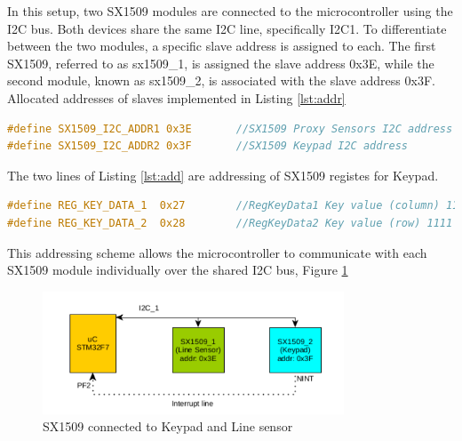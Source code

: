 \documentclass[english]{article}
\begin{document}
In this setup, two SX1509 modules are connected to the microcontroller using the I2C bus. 
Both devices share the same I2C line, specifically I2C1. To differentiate between the two modules,
a specific slave address is assigned to each. 
The first SX1509, referred to as sx1509\_1, is assigned
  the slave address 0x3E, while the second module, known as sx1509\_2, is associated with the slave address 0x3F.
\\Allocated addresses of slaves implemented in Listing \ref{lst:addr}
\begin{lstlisting}[language=C, caption={I2C Addresses}, label={lst:addr} ]
#define SX1509_I2C_ADDR1 0x3E       //SX1509 Proxy Sensors I2C address
#define SX1509_I2C_ADDR2 0x3F       //SX1509 Keypad I2C address
\end{lstlisting}
The two lines of Listing \ref{lst:add} are addressing of SX1509 registes for Keypad.
\begin{lstlisting}[language=C, caption={Keypad Data registers}, label={lst:add} ]
#define REG_KEY_DATA_1  0x27        //RegKeyData1 Key value (column) 1111 1111
#define REG_KEY_DATA_2  0x28	    //RegKeyData2 Key value (row) 1111 1111
\end{lstlisting}
This addressing scheme allows the microcontroller to communicate with each SX1509 module individually over the shared I2C bus,
Figure \ref{fig:SX1509}
\begin{figure}[!h]
	\centering
	\includegraphics[width=0.80\textwidth,]{figures/SX.png}
	\caption{SX1509 connected to Keypad and Line sensor}
	\label{fig:SX1509}
\end{figure}
\end{document}
